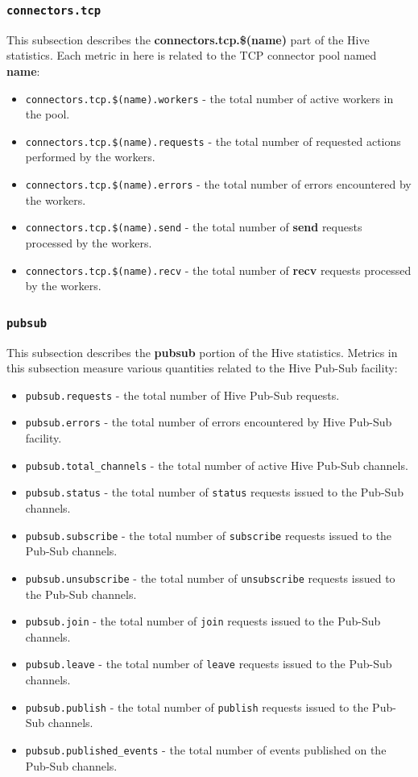 \documentclass[a4paper]{article}
\begin{document}
\subsubsection{\texttt{connectors.tcp}}
\label{sec-4-2-13}

This subsection describes the \textbf{connectors.tcp.\$(name)} part of the Hive statistics. Each metric in here is related to the TCP connector pool named \textbf{name}:


\begin{itemize}
\item \texttt{connectors.tcp.\$(name).workers} - the total number of active workers in the pool.
\item \texttt{connectors.tcp.\$(name).requests} - the total number of requested actions performed by the workers.
\item \texttt{connectors.tcp.\$(name).errors} - the total number of errors encountered by the workers.
\item \texttt{connectors.tcp.\$(name).send} - the total number of \textbf{send} requests processed by the workers.
\item \texttt{connectors.tcp.\$(name).recv} - the total number of \textbf{recv} requests processed by the workers.
\end{itemize}
\subsubsection{\texttt{pubsub}}
\label{sec-4-2-14}

This subsection describes the \textbf{pubsub} portion of the Hive statistics. Metrics in this subsection measure various quantities related to the Hive Pub-Sub facility:


\begin{itemize}
\item \texttt{pubsub.requests} - the total number of Hive Pub-Sub requests.
\item \texttt{pubsub.errors} - the total number of errors encountered by Hive Pub-Sub facility.
\item \texttt{pubsub.total\_channels} - the total number of active Hive Pub-Sub channels.
\item \texttt{pubsub.status} - the total number of \texttt{status} requests issued to the Pub-Sub channels.
\item \texttt{pubsub.subscribe} - the total number of \texttt{subscribe} requests issued to the Pub-Sub channels.
\item \texttt{pubsub.unsubscribe} - the total number of \texttt{unsubscribe} requests issued to the Pub-Sub channels.
\item \texttt{pubsub.join} - the total number of \texttt{join} requests issued to the Pub-Sub channels.
\item \texttt{pubsub.leave} - the total number of \texttt{leave} requests issued to the Pub-Sub channels.
\item \texttt{pubsub.publish} - the total number of \texttt{publish} requests issued to the Pub-Sub channels.
\item \texttt{pubsub.published\_events} - the total number of events published on the Pub-Sub channels.
\end{itemize}
\end{document}
